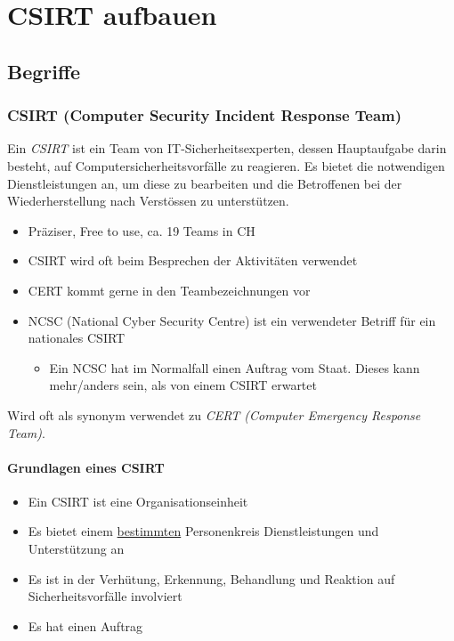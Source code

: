 \section{CSIRT aufbauen}

\subsection{Begriffe}

\subsubsection{CSIRT (Computer Security Incident Response Team)}
Ein \textit{CSIRT} ist ein Team von IT-Sicherheitsexperten, dessen Hauptaufgabe darin besteht, auf Computersicherheitsvorfälle zu reagieren. Es bietet die notwendigen Dienstleistungen an, um diese zu bearbeiten und die Betroffenen bei der Wiederherstellung nach Verstössen zu unterstützen.

\begin{itemize}
    \item Präziser, Free to use, ca. 19 Teams in CH
    \item CSIRT wird oft beim Besprechen der Aktivitäten verwendet
    \item CERT kommt gerne in den Teambezeichnungen vor
    \item NCSC (National Cyber Security Centre) ist ein verwendeter Betriff für ein \glqq nationales CSIRT\grqq
    \begin{itemize}
        \item Ein NCSC hat im Normalfall einen Auftrag vom Staat. Dieses kann mehr/anders sein, als von einem CSIRT erwartet
    \end{itemize}
\end{itemize}
 Wird oft als synonym verwendet zu \textit{CERT (Computer Emergency Response Team)}.

 \paragraph{Grundlagen eines CSIRT}
 \begin{itemize}
    \item Ein CSIRT ist eine Organisationseinheit
    \item Es bietet einem \underline{bestimmten} Personenkreis Dienstleistungen und Unterstützung an
    \item Es ist in der Verhütung, Erkennung, Behandlung und Reaktion auf Sicherheitsvorfälle involviert
    \item Es hat einen Auftrag
 \end{itemize}

